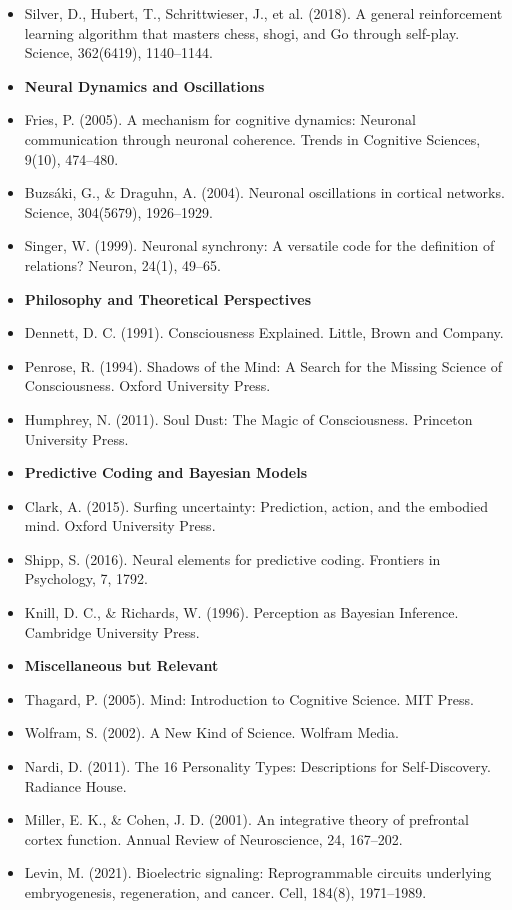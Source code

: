 \begin{itemize}
\item Silver, D., Hubert, T., Schrittwieser, J., et al. (2018). A general reinforcement learning algorithm that masters chess, shogi, and Go through self-play. Science, 362(6419), 1140--1144.
\item[] \textbf{Neural Dynamics and Oscillations}
\item Fries, P. (2005). A mechanism for cognitive dynamics: Neuronal communication through neuronal coherence. Trends in Cognitive Sciences, 9(10), 474--480.
\item Buzs\'aki, G., \& Draguhn, A. (2004). Neuronal oscillations in cortical networks. Science, 304(5679), 1926--1929.
\item Singer, W. (1999). Neuronal synchrony: A versatile code for the definition of relations? Neuron, 24(1), 49--65.
\item[] \textbf{Philosophy and Theoretical Perspectives}
\item Dennett, D. C. (1991). Consciousness Explained. Little, Brown and Company.
\item Penrose, R. (1994). Shadows of the Mind: A Search for the Missing Science of Consciousness. Oxford University Press.
\item Humphrey, N. (2011). Soul Dust: The Magic of Consciousness. Princeton University Press.
\item[] \textbf{Predictive Coding and Bayesian Models}
\item Clark, A. (2015). Surfing uncertainty: Prediction, action, and the embodied mind. Oxford University Press.
\item Shipp, S. (2016). Neural elements for predictive coding. Frontiers in Psychology, 7, 1792.
\item Knill, D. C., \& Richards, W. (1996). Perception as Bayesian Inference. Cambridge University Press.
\item[] \textbf{Miscellaneous but Relevant}
\item Thagard, P. (2005). Mind: Introduction to Cognitive Science. MIT Press.
\item Wolfram, S. (2002). A New Kind of Science. Wolfram Media.
\item Nardi, D. (2011). The 16 Personality Types: Descriptions for Self-Discovery. Radiance House.
\item Miller, E. K., \& Cohen, J. D. (2001). An integrative theory of prefrontal cortex function. Annual Review of Neuroscience, 24, 167--202.
\item Levin, M. (2021). Bioelectric signaling: Reprogrammable circuits underlying embryogenesis, regeneration, and cancer. Cell, 184(8), 1971--1989.

\end{itemize}
